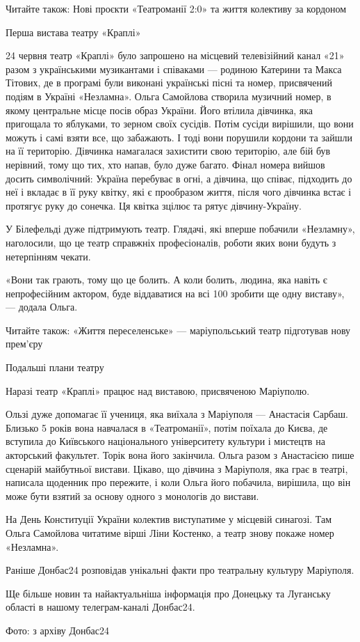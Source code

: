 Читайте також: Нові проєкти «Театроманії 2:0» та життя колективу за кордоном

Перша вистава театру «Краплі»

24 червня театр «Краплі» було запрошено на місцевий телевізійний канал «21»
разом з українськими музикантами і співаками — родиною Катерини та Макса
Тітових, де в програмі були виконані українські пісні та номер, присвячений
подіям в Україні «Незламна». Ольга Самойлова створила музичний номер, в якому
центральне місце посів образ України. Його втілила дівчинка, яка пригощала то
яблуками, то зерном своїх сусідів. Потім сусіди вирішили, що вони можуть і самі
взяти все, що забажають. І тоді вони порушили кордони та зайшли на її
територію. Дівчинка намагалася захистити свою територію, але бій був нерівний,
тому що тих, хто напав, було дуже багато. Фінал номера вийшов досить
символічний: Україна перебуває в огні, а дівчина, що співає, підходить до неї і
вкладає в її руку квітку, які є прообразом життя, після чого дівчинка встає і
протягує руку до сонечка. Ця квітка зцілює та рятує дівчину-Україну.

У Білефельді дуже підтримують театр. Глядачі, які вперше побачили «Незламну»,
наголосили, що це театр справжніх професіоналів, роботи яких вони будуть з
нетерпінням чекати.

«Вони так грають, тому що це болить. А коли болить, людина, яка навіть є
непрофесійним актором, буде віддаватися на всі 100%
зробити ще одну виставу», — додала Ольга.

Читайте також: «Життя переселенське» — маріупольський театр підготував нову
прем'єру

Подальші плани театру

Наразі театр «Краплі» працює над виставою, присвяченою Маріуполю.

Ользі дуже допомагає її учениця, яка виїхала з Маріуполя — Анастасія Сарбаш.
Близько 5 років вона навчалася в «Театроманії», потім поїхала до Києва, де
вступила до Київського національного університету культури і мистецтв на
акторський факультет. Торік вона його закінчила. Ольга разом з Анастасією пише
сценарій майбутньої вистави. Цікаво, що дівчина з Маріуполя, яка грає в театрі,
написала щоденник про пережите, і коли Ольга його побачила, вирішила, що він
може бути взятий за основу одного з монологів до вистави.

На День Конституції України колектив виступатиме у місцевій синагозі. Там Ольга
Самойлова читатиме вірші Ліни Костенко, а театр знову покаже номер «Незламна».

Раніше Донбас24 розповідав унікальні факти про театральну культуру Маріуполя.

Ще більше новин та найактуальніша інформація про Донецьку та Луганську області
в нашому телеграм-каналі Донбас24.

Фото: з архіву Донбас24
